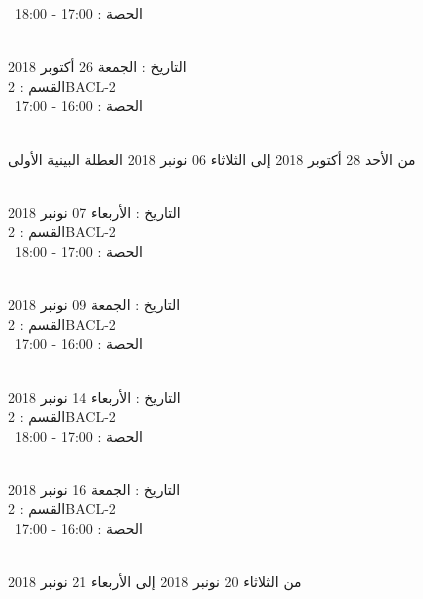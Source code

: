\documentclass[14pt a4paper twocolumn]{book}
\begin{document}
 \  
الحصة : 17:00 - 18:00 \\
\par
\noindent\makebox[\linewidth]{\rule{\paperwidth}{0.4pt}}
 \\
التاريخ : الجمعة 26 أكتوبر 2018 \\
القسم : 2BACL-2 \\
 \  
الحصة : 16:00 - 17:00 \\
\par
\noindent\makebox[\linewidth]{\rule{\paperwidth}{0.4pt}}
 \\
من الأحد 28 أكتوبر 2018 إلى الثلاثاء 06 نونبر 2018
\newline
\indent
 العطلة البينية الأولى
\par
\noindent\makebox[\linewidth]{\rule{\paperwidth}{0.4pt}}
 \\
التاريخ : الأربعاء 07 نونبر 2018 \\
القسم : 2BACL-2 \\
 \  
الحصة : 17:00 - 18:00 \\
\par
\noindent\makebox[\linewidth]{\rule{\paperwidth}{0.4pt}}
 \\
التاريخ : الجمعة 09 نونبر 2018 \\
القسم : 2BACL-2 \\
 \  
الحصة : 16:00 - 17:00 \\
\par
\noindent\makebox[\linewidth]{\rule{\paperwidth}{0.4pt}}
 \\
التاريخ : الأربعاء 14 نونبر 2018 \\
القسم : 2BACL-2 \\
 \  
الحصة : 17:00 - 18:00 \\
\par
\noindent\makebox[\linewidth]{\rule{\paperwidth}{0.4pt}}
 \\
التاريخ : الجمعة 16 نونبر 2018 \\
القسم : 2BACL-2 \\
 \  
الحصة : 16:00 - 17:00 \\
\par
\noindent\makebox[\linewidth]{\rule{\paperwidth}{0.4pt}}
 \\
من الثلاثاء 20 نونبر 2018 إلى الأربعاء 21 نونبر 2018
\newline
\end{document}
